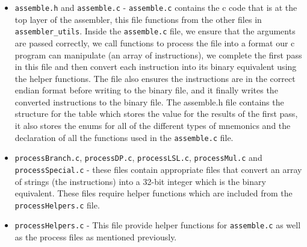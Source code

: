 \documentclass[10pt]{article}
\begin{document}
\begin{itemize}
    \item {\tt{assemble.h}} and {\tt{assemble.c}} - {\tt{assemble.c}} contains the c code that is at the top layer of the assembler, this file functions from the other files in {\tt{assembler\_utils}}. Inside the {\tt{assemble.c}} file, we ensure that the arguments are passed correctly, we call functions to process the file into a format our c program can manipulate (an array of instructions), we complete the first pass in this file and then convert each instruction into its binary equivalent using the helper functions. The file also ensures the instructions are in the correct endian format before writing to the binary file, and it finally writes the converted instructions to the binary file.
    The assemble.h file contains the structure for the table which stores the value for the results of the first pass, it also stores the enums for all of the different types of mnemonics and the declaration of all the functions used in the {\tt{assemble.c}} file.
    \item {\tt{processBranch.c}}, {\tt{processDP.c}}, {\tt{processLSL.c}}, {\tt{processMul.c}} and {\tt{processSpecial.c}} - these files contain appropriate files that convert an array of strings (the instructions) into a 32-bit integer which is the binary equivalent. These files require helper functions which are included from the {\tt{processHelpers.c}} file.
    \item {\tt{processHelpers.c}} - This file provide helper functions for {\tt{assemble.c}} as well as the process files as mentioned previously.
    
\end{itemize}


\begin{center}

\end{center}
\end{document}
